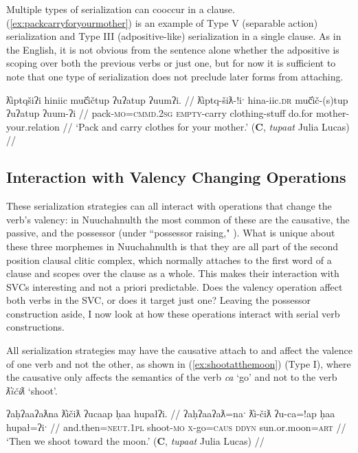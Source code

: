Multiple types of serialization can cooccur in a clause. (\ref{ex:packcarryforyourmother}) is an example of Type V (separable action) serialization and Type III (adpositive-like) serialization in a single clause. As in the English, it is not obvious from the sentence alone whether the adpositive is scoping over both the previous verbs or just one, but for now it is sufficient to note that one type of serialization does not preclude later forms from attaching.

\ex \label{ex:packcarryforyourmother}
\begingl
\glpreamble ƛ̓iptqšiʔi hiniic muč̓ičtup ʔuʔatup ʔuumʔi. //
\gla ƛ̓iptq-šiƛ-!iˑ hina-iic.\textsc{dr} muč̓ič-(s)tup ʔuʔatup ʔuum-ʔi //
\glb pack-\textsc{mo}=\textsc{cmmd.2sg} \textsc{empty}-carry clothing-stuff do.for mother-your.relation //
\glft `Pack and carry clothes for your mother.' (\textbf{C}, \textit{tupaat} Julia Lucas) //
\endgl
\xe

\subsection{Interaction with Valency Changing Operations} \label{sec:svc:valence}

These serialization strategies can all interact with operations that change the verb's valency: in Nuuchahnulth the most common of these are the causative, the passive, and the possessor (under ``possessor raising," \citealt{braithwaite2003}). What is unique about these three morphemes in Nuuchahnulth is that they are all part of the second position clausal clitic complex, which normally attaches to the first word of a clause and scopes over the clause as a whole. This makes their interaction with SVCs interesting and not a priori predictable. Does the valency operation affect both verbs in the SVC, or does it target just one? Leaving the possessor construction aside, I now look at how these operations interact with serial verb constructions.

All serialization strategies may have the causative attach to and affect the valence of one verb and not the other, as shown in (\ref{ex:shootatthemoon}) (Type I), where the causative only affects the semantics of the verb \textit{ca} `go' and not to the verb \textit{ƛ̓ičiƛ} `shoot'.

\ex \label{ex:shootatthemoon}
\begingl
\glpreamble ʔaḥʔaaʔaƛna ƛ̓ičiƛ ʔucaap ḥaa hupałʔi. //
\gla ʔaḥʔaaʔaƛ=naˑ ƛ̓i-čiƛ ʔu-ca=!ap ḥaa hupał=ʔiˑ //
\glb and.then=\textsc{neut.1pl} shoot-\textsc{mo} \textsc{x}-go=\textsc{caus} \textsc{ddyn} sun.or.moon=\textsc{art} //
\glft `Then we shoot toward the moon.' (\textbf{C}, \textit{tupaat} Julia Lucas) //
\endgl
\xe

